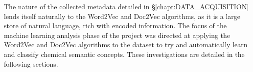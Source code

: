 The nature of the collected metadata detailed in \S\ref{chapt:DATA_ACQUISITION} lends itself naturally to the Word2Vec and Doc2Vec algorithms, as it is a large store of natural language, rich with encoded information. The focus of the machine learning analysis phase of the project was directed at applying the Word2Vec and Doc2Vec algorithms to the dataset to try and automatically learn and classify chemical semantic concepts. These investigations are detailed in the following sections.